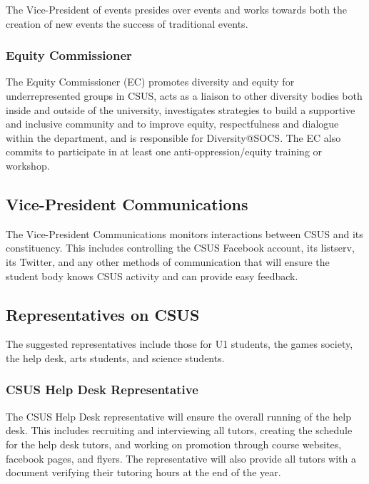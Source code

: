 The Vice-President of events presides over events and works towards both
the creation of new events the success of traditional events.

\subsubsection{Equity Commissioner}\label{equity-commissioner}

The Equity Commissioner (EC) promotes diversity and equity for
underrepresented groups in CSUS, acts as a liaison to other diversity
bodies both inside and outside of the university, investigates
strategies to build a supportive and inclusive community and to improve
equity, respectfulness and dialogue within the department, and is
responsible for Diversity@SOCS. The EC also commits to participate in at
least one anti-oppression/equity training or workshop.

\subsection{Vice-President
Communications}\label{vice-president-communications}

The Vice-President Communications monitors interactions between CSUS and
its constituency. This includes controlling the CSUS Facebook account,
its listserv, its Twitter, and any other methods of communication that
will ensure the student body knows CSUS activity and can provide easy
feedback.

\subsection{Representatives on CSUS}\label{representatives-on-csus}

The suggested representatives include those for U1 students, the games
society, the help desk, arts students, and science students.

\subsubsection{CSUS Help Desk
Representative}\label{csus-help-desk-representative}

The CSUS Help Desk representative will ensure the overall running of the
help desk. This includes recruiting and interviewing all tutors,
creating the schedule for the help desk tutors, and working on promotion
through course websites, facebook pages, and flyers. The representative
will also provide all tutors with a document verifying their tutoring
hours at the end of the year.

